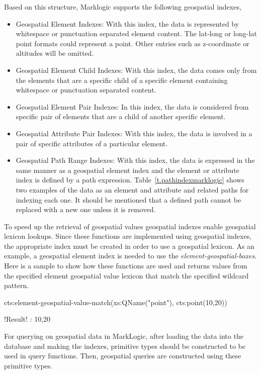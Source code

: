 \documentclass[a4paper,12pt]{article}
\begin{document}
\vspace{10px}
Based on this structure, Marklogic supports the following geospatial indexes,
\begin{itemize}
\item Geospatial Element Indexes: With this index, the data is represented by whitespace or punctuation separated element content. The lat-long or long-lat point formats could represent a point. Other entries such as z-coordinate or altitudes will be omitted.
\item Geospatial Element Child Indexes: With this index, the data comes only from the elements that are a specific child of a specific element containing whitespace or punctuation separated content.
\item Geospatial Element Pair Indexes: In this index, the data is considered from specific pair of elements that are a child of another specific element.
\item Geospatial Attribute Pair Indexes: With this index, the data is involved in a pair of specific attributes of a particular element.
\item Geospatial Path Range Indexes: With this index, the data is expressed in the same manner as a geospatial element index and the element or attribute index is defined by a path expression. Table~\ref{t.pathindexmarklogic} shows two examples of the data as an element and attribute and related paths for indexing each one. It should be mentioned that a defined path cannot be replaced with a new one unless it is removed.
\end{itemize}

To speed up the retrieval of geospatial values geospatial indexes enable geospatial lexicon lookups. Since these functions are implemented using geospatial indexes, the appropriate index must be created in order to use a geospatial lexicon. As an example, a geospatial element index is needed to use the \textit{element-geospatial-boxes}. Here is a sample to show how these functions are used and returns values from the specified element geospatial value lexicon that match the specified wildcard pattern.
\vspace{10px}
\begin{fakeJSON}[escapechar=\!]
cts:element-geospatial-value-match(xs:QName("point"),
cts:point(10,20))

!\colorbox{light-gray}{Result}! : 10,20
\end{fakeJSON}
\vspace{10px}

For querying on geospatial data in MarkLogic, after loading the data into the database and making the indexes, primitive types should be constructed to be used in query functions. Then, geospatial queries are constructed using these primitive types. 
\end{document}
